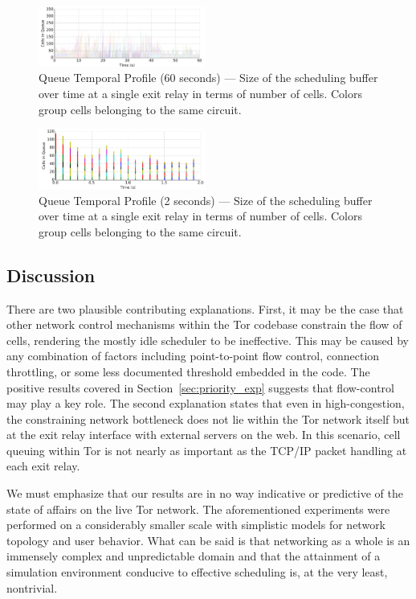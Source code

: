 \begin{figure} \centering
  \includegraphics[width=0.49\textwidth]{images/scheduling_far.png}
  \caption[Queue Temporal Profile (60 seconds)]{Queue Temporal Profile
      (60 seconds) --- Size of the scheduling buffer over time at a single exit
    relay in terms of number of cells. Colors group cells belonging to the same circuit.}
  \label{fig:scheduling_far}
\end{figure}

\begin{figure} \centering
  \includegraphics[width=0.49\textwidth]{images/scheduling_close.png}
  \caption[Queue Temporal Profile (2 seconds)]{Queue Temporal Profile
      (2 seconds) --- Size of the scheduling buffer over time at a single exit
    relay in terms of number of cells. Colors group cells belonging to the same
    circuit.}
  \label{fig:scheduling_close}
\end{figure}

\subsection{Discussion}

There are two plausible contributing explanations. First, it may be the case
that other network control mechanisms within the Tor codebase constrain the flow
of cells, rendering the mostly idle scheduler to be ineffective. This may be
caused by any combination of factors including point-to-point flow control,
connection throttling, or some less documented threshold embedded in the
code. The positive results covered in Section~\ref{sec:priority_exp} suggests
that flow-control may play a key role. The second explanation states that even
in high-congestion, the constraining network bottleneck does not lie within the
Tor network itself but at the exit relay interface with external servers on the
web. In this scenario, cell queuing within Tor is not nearly as important as the
TCP/IP packet handling at each exit relay.

We must emphasize that our results are in no way indicative or predictive of the
state of affairs on the live Tor network. The aforementioned experiments were
performed on a considerably smaller scale with simplistic models for network
topology and user behavior. What can be said is that networking as a whole is an
immensely complex and unpredictable domain and that the attainment of a
simulation environment conducive to effective scheduling is, at the very least,
nontrivial.
